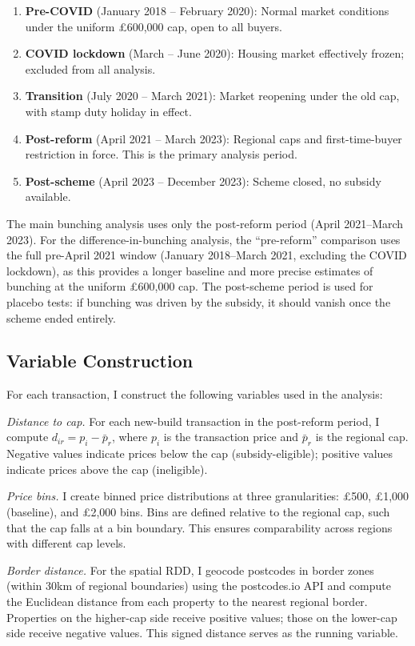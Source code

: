 \documentclass[12pt]{article}
\begin{document}
\begin{enumerate}
\item \textbf{Pre-COVID} (January 2018 -- February 2020): Normal market conditions under the uniform \pounds600,000 cap, open to all buyers.
\item \textbf{COVID lockdown} (March -- June 2020): Housing market effectively frozen; excluded from all analysis.
\item \textbf{Transition} (July 2020 -- March 2021): Market reopening under the old cap, with stamp duty holiday in effect.
\item \textbf{Post-reform} (April 2021 -- March 2023): Regional caps and first-time-buyer restriction in force. This is the primary analysis period.
\item \textbf{Post-scheme} (April 2023 -- December 2023): Scheme closed, no subsidy available.
\end{enumerate}

The main bunching analysis uses only the post-reform period (April 2021--March 2023). For the difference-in-bunching analysis, the ``pre-reform'' comparison uses the full pre-April 2021 window (January 2018--March 2021, excluding the COVID lockdown), as this provides a longer baseline and more precise estimates of bunching at the uniform \pounds600,000 cap. The post-scheme period is used for placebo tests: if bunching was driven by the subsidy, it should vanish once the scheme ended entirely.

\subsection{Variable Construction}

For each transaction, I construct the following variables used in the analysis:

\textit{Distance to cap.} For each new-build transaction in the post-reform period, I compute $d_{ir} = p_i - \bar{p}_r$, where $p_i$ is the transaction price and $\bar{p}_r$ is the regional cap. Negative values indicate prices below the cap (subsidy-eligible); positive values indicate prices above the cap (ineligible).

\textit{Price bins.} I create binned price distributions at three granularities: \pounds500, \pounds1,000 (baseline), and \pounds2,000 bins. Bins are defined relative to the regional cap, such that the cap falls at a bin boundary. This ensures comparability across regions with different cap levels.

\textit{Border distance.} For the spatial RDD, I geocode postcodes in border zones (within 30km of regional boundaries) using the postcodes.io API and compute the Euclidean distance from each property to the nearest regional border. Properties on the higher-cap side receive positive values; those on the lower-cap side receive negative values. This signed distance serves as the running variable.
\end{document}
